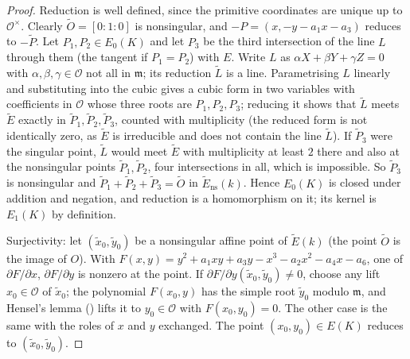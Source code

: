 \begin{proof}
Reduction is well defined, since the primitive coordinates are unique up to $\mathcal O^\times$. Clearly
$\tilde O=[0:1:0]$ is nonsingular, and $-P=(x,-y-a_1x-a_3)$ reduces to $-\tilde P$.
Let $P_1,P_2\in E_0(K)$ and let $P_3$ be the third intersection of the line $L$ through them (the tangent if
$P_1=P_2$) with $E$. Write $L$ as $\alpha X+\beta Y+\gamma Z=0$ with $\alpha,\beta,\gamma\in\mathcal O$ not all in $\mathfrak m$; its
reduction $\tilde L$ is a line. Parametrising $L$ linearly and substituting into the cubic gives a cubic form in two
variables with coefficients in $\mathcal O$ whose three roots are $P_1,P_2,P_3$; reducing it shows that $\tilde L$
meets $\tilde E$ exactly in $\tilde P_1,\tilde P_2,\tilde P_3$, counted with multiplicity (the reduced form is not
identically zero, as $\tilde E$ is irreducible and does not contain the line $\tilde L$). If $\tilde P_3$ were the
singular point, $\tilde L$ would meet $\tilde E$ with multiplicity at least $2$ there and also at the nonsingular
points $\tilde P_1,\tilde P_2$, four intersections in all, which is impossible. So $\tilde P_3$ is nonsingular and
$\tilde P_1+\tilde P_2+\tilde P_3=\tilde O$ in $\tilde E_{\mathrm{ns}}(k)$. Hence $E_0(K)$ is closed under addition
and negation, and reduction is a homomorphism on it; its kernel is $E_1(K)$ by definition.

Surjectivity: let $(\tilde x_0,\tilde y_0)$ be a nonsingular affine point of $\tilde E(k)$ (the point $\tilde O$ is
the image of $O$). With $F(x,y)=y^2+a_1xy+a_3y-x^3-a_2x^2-a_4x-a_6$, one of $\partial F/\partial x$,
$\partial F/\partial y$ is nonzero at the point. If $\partial F/\partial y(\tilde x_0,\tilde y_0)\ne0$, choose
any lift $x_0\in\mathcal O$ of $\tilde x_0$; the polynomial $F(x_0,y)$ has the simple root $\tilde y_0$ modulo $\mathfrak m$,
and Hensel's lemma () lifts it to $y_0\in\mathcal O$ with $F(x_0,y_0)=0$. The other case is the same
with the roles of $x$ and $y$ exchanged. The point $(x_0,y_0)\in E(K)$ reduces to $(\tilde x_0,\tilde y_0)$.
\end{proof}

